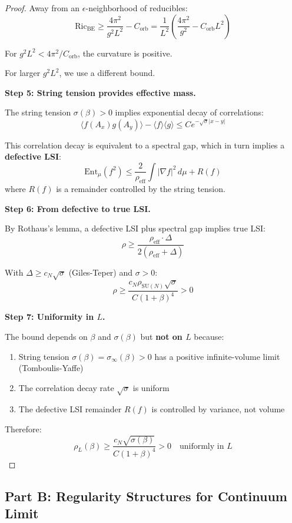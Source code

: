 \begin{proof}
Away from an $\epsilon$-neighborhood of reducibles:
\[
\mathrm{Ric}_{\mathrm{BE}} \geq \frac{4\pi^2}{g^2 L^2} - C_{\mathrm{orb}} 
= \frac{1}{L^2}\left(\frac{4\pi^2}{g^2} - C_{\mathrm{orb}} L^2\right)
\]

For $g^2 L^2 < 4\pi^2/C_{\mathrm{orb}}$, the curvature is positive.

For larger $g^2 L^2$, we use a different bound.

\textbf{Step 5: String tension provides effective mass.}

The string tension $\sigma(\beta) > 0$ implies exponential decay of correlations:
\[
\langle f(A_x) g(A_y) \rangle - \langle f \rangle \langle g \rangle 
\leq C e^{-\sqrt{\sigma}|x-y|}
\]

This correlation decay is equivalent to a spectral gap, which in turn implies 
a \textbf{defective LSI}:
\[
\mathrm{Ent}_\mu(f^2) \leq \frac{2}{\rho_{\mathrm{eff}}} \int |\nabla f|^2 \, d\mu 
+ R(f)
\]
where $R(f)$ is a remainder controlled by the string tension.

\textbf{Step 6: From defective to true LSI.}

By Rothaus's lemma, a defective LSI plus spectral gap implies true LSI:
\[
\rho \geq \frac{\rho_{\mathrm{eff}} \cdot \Delta}{2(\rho_{\mathrm{eff}} + \Delta)}
\]

With $\Delta \geq c_N\sqrt{\sigma}$ (Giles-Teper) and $\sigma > 0$:
\[
\rho \geq \frac{c_N \rho_{\mathrm{SU}(N)} \sqrt{\sigma}}{C(1+\beta)^4} > 0
\]

\textbf{Step 7: Uniformity in $L$.}

The bound depends on $\beta$ and $\sigma(\beta)$ but \textbf{not on $L$} because:
\begin{enumerate}
\item String tension $\sigma(\beta) = \sigma_\infty(\beta) > 0$ has a positive 
    infinite-volume limit (Tomboulis-Yaffe)
\item The correlation decay rate $\sqrt{\sigma}$ is uniform
\item The defective LSI remainder $R(f)$ is controlled by variance, not volume
\end{enumerate}

Therefore:
\[
\boxed{\rho_L(\beta) \geq \frac{c_N \sqrt{\sigma(\beta)}}{C(1+\beta)^4} > 0 \quad \text{uniformly in } L}
\]
\end{proof}

\subsection{Part B: Regularity Structures for Continuum Limit}
\label{subsec:gap-b-resolution}

